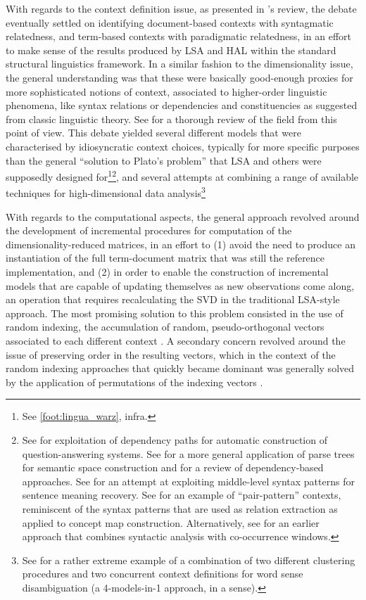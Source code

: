 With regards to the context definition issue, as presented in \citeauthor{sahlgren2006}'s review, the debate eventually settled on identifying document-based contexts with syntagmatic relatedness, and term-based contexts with paradigmatic relatedness, in an effort to make sense of the results produced by LSA and HAL within the standard structural linguistics framework.
In a similar fashion to the dimensionality issue, the general understanding was that these were basically good-enough proxies for more sophisticated notions of context, associated to higher-order linguistic phenomena, like syntax relations or dependencies and constituencies as suggested from classic linguistic theory.
See \citet{turney2010} for a thorough review of the field from this point of view.
This debate yielded several different models that were characterised by idiosyncratic context choices, typically for more specific purposes than the general ``solution to Plato's problem'' that LSA and others were supposedly designed for\footnote{
    See \autoref{foot:lingua_warz}, infra.
}\footnote{
    See \citet{lin2001} for exploitation of dependency paths for automatic construction of question-answering systems.
    See \citet{pado2003} for a more general application of parse trees for semantic space construction and \citet{pado2007} for a review of dependency-based approaches.
    See \citet{erk2008} for an attempt at exploiting middle-level syntax patterns for sentence meaning recovery.
    See \citet[op. cit.]{turney2010} for an example of ``pair-pattern'' contexts, reminiscent of the syntax patterns that are used as relation extraction as applied to concept map construction.
    Alternatively, see \citet{grefenstette1994} for an earlier approach that combines syntactic analysis with co-occurrence windows.
}, and several attempts at combining a range of available techniques for high-dimensional data analysis\footnote{
    See \citet{purandare2004} for a rather extreme example of a combination of two different clustering procedures and two concurrent context definitions for word sense disambiguation (a 4-models-in-1 approach, in a sense).
}

With regards to the computational aspects, the general approach revolved around the development of incremental procedures for computation of the dimensionality-reduced matrices, in an effort to (1) avoid the need to produce an instantiation of the full term-document matrix that was still the reference implementation, and (2) in order to enable the construction of incremental models that are capable of updating themselves as new observations come along, an operation that requires recalculating the SVD in the traditional LSA-style approach.
The most promising solution to this problem consisted in the use of random indexing, the accumulation of random, pseudo-orthogonal vectors associated to each different context \citep{sahlgren2005,baroni2007,jurgens2009,cohen2010}.
A secondary concern revolved around the issue of preserving order in the resulting vectors, which in the context of the random indexing approaches that quickly became dominant was generally solved by the application of permutations of the indexing vectors \citep{jones2007,sahlgren2008}.

